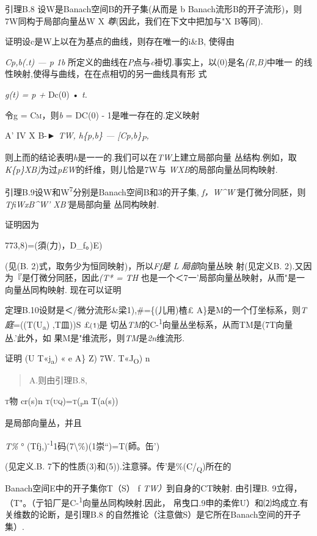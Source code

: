 \documentclass{article}
\begin{document}
引理B.8 设W是Banach空间B的开子集(从而是 b
Banach流形B的开子流形)，则7W同构于局部向量丛W X
\emph{尊}(因此，我们在下文中把加与"X B等同).

证明设c是W上以在为基点的曲线，则存在唯一的i\&B, 使得由

\emph{Cp,b(.t) --- p 1b}
所定义的曲线在\emph{P}点与\emph{c}褂切.事实上，以(0)是名\emph{(R,B)}中唯一
的线性映射,使得与曲线，在在点相切的另一曲线具有形 式

\emph{g(t) = p +} Dc(0) • \emph{t.}

令g = \textsc{Cm，}则\emph{b} = DC(0) - 1是唯一存在的.定义映射

A' IV X B-► \emph{TW, h\{p,b\} --- {[}Cp,b\}\textsubscript{P},}

则上而的结论表明\emph{h}是一一的.我们可以在\emph{TW}上建立局部向量
丛结构.例如，取\emph{K\{p\}XB)}为过\emph{pEW}的纤维，则儿恰是7W与
\emph{WXB}的局部向量丛同构映射.\textbar{}

引理B.9设W和W\textsuperscript{7}分别是Banach空间B和3的开子集,
\emph{f，W\^{}W'}是仃微分同胚，则\emph{TfiWxB\^{}W' XB'}是局部向量
丛同构映射.

证明因为

773,8)=(須(力)，D\_f。)E)

(见(B. 2)式，取务少为恒同映射)，所以\emph{Ff是 L 局部}向量丛映
射(见定义B. 2).又因为『是仃微分同胚，因此\emph{(T* = TH}
也是一个＜7一'局部向量丛映射，从而"是一向量丛同构映射.\textbar{}
现在可以证明

定理B.10设财是＜/微分流形\&梁1),\#=\{(儿用)楂£
A\}是M的一个仃坐标系，则\emph{T庭}=((T(U\textsubscript{a}) ,T皿))S £⑴是
切丛\emph{TM}的C-\textsuperscript{1}向量丛坐标系，从而TM是(7T向量丛.'此外，如
果M是"维流形，则\emph{TM}是\emph{2n}维流形.

证明 (U T«j\textsubscript{a}) \textbar{}« e A\} Z) 7W.
T«J\textsubscript{O}) n

\begin{quote}
A.则由引理B.8,
\end{quote}

\textsc{t}物 cr(s)n \textsc{t(uq)=t(\textsubscript{p}}n T(a(s))

是局部向量丛，并且

\emph{T\%} °
(Tfj,)\textsuperscript{-1}1码(7\textbackslash{}\%)(1崇``)=T(師。缶')

(见定义.B. 7下的性质(3)和(5)).注意驿。传'是\%(C/\textsubscript{Q})所在的

Banach空间E中的开子集你T（S） f\textbar{} \emph{TW）}到自身的CT映射.
由引理B.
9立得，（T"。（亍铅厂是C-\textsuperscript{1}向量丛同构映射.因此，
帛曳口.9申的柔侔U）和⑵坞成立.有关维数的论断，是引理B.8
的自然推论（注意做S）是它所在Banach空间的开子集）.\textbar{}
\end{document}
